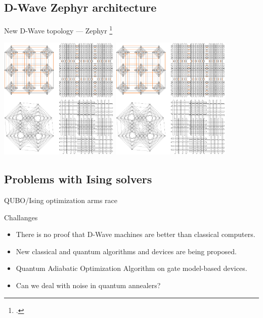 \subsection{D-Wave Zephyr architecture}
\begin{frame}{New D-Wave topology --- Zephyr \footcite{Boothby2021}}
    \begin{center}
        \includegraphics[width=0.43\textwidth, page=1]{pics/adiabatic/zephyr.pdf}
        \includegraphics[width=0.43\textwidth, page=2]{pics/adiabatic/zephyr.pdf}
    \end{center}
\end{frame}
\subsection{Problems with Ising solvers}
\begin{frame}{QUBO/Ising optimization arms race}
    \begin{block}{Challanges}
        \begin{itemize}
            \item There is no proof that D-Wave machines are better than classical computers.
            \item New classical and quantum algorithms and devices are being proposed.
            \item Quantum Adiabatic Optimization Algorithm on gate model-based devices.
            \item Can we deal with noise in quantum annealers?
        \end{itemize}            
    \end{block}
\end{frame}